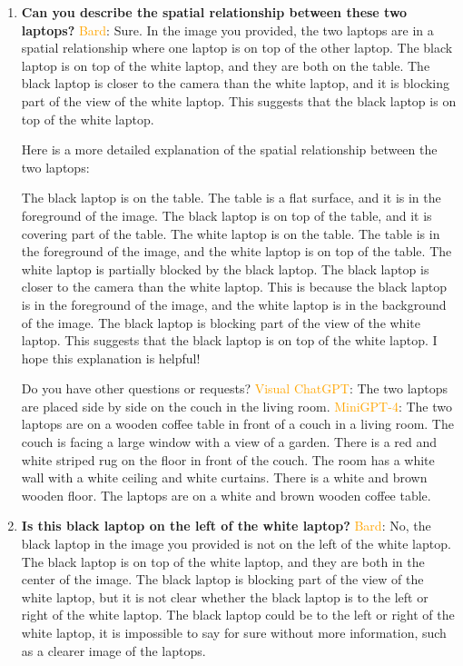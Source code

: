 \begin{enumerate}
    \item \textbf{Can you describe the spatial relationship between these two laptops?}
    \subitem \textcolor{orange}{Bard}: Sure. In the image you provided, the two laptops are in a spatial relationship where one laptop is on top of the other laptop. The black laptop is on top of the white laptop, and they are both on the table. The black laptop is closer to the camera than the white laptop, and it is blocking part of the view of the white laptop. This suggests that the black laptop is on top of the white laptop.

    Here is a more detailed explanation of the spatial relationship between the two laptops:
    
    The black laptop is on the table. The table is a flat surface, and it is in the foreground of the image. The black laptop is on top of the table, and it is covering part of the table.
    The white laptop is on the table. The table is in the foreground of the image, and the white laptop is on top of the table. The white laptop is partially blocked by the black laptop.
    The black laptop is closer to the camera than the white laptop. This is because the black laptop is in the foreground of the image, and the white laptop is in the background of the image.
    The black laptop is blocking part of the view of the white laptop. This suggests that the black laptop is on top of the white laptop.
    I hope this explanation is helpful!
    
    Do you have other questions or requests?
    \subitem \textcolor{orange}{Visual ChatGPT}: The two laptops are placed side by side on the couch in the living room.
    \subitem \textcolor{orange}{MiniGPT-4}: The two laptops are on a wooden coffee table in front of a couch in a living room. The couch is facing a large window with a view of a garden. There is a red and white striped rug on the floor in front of the couch. The room has a white wall with a white ceiling and white curtains. There is a white and brown wooden floor. The laptops are on a white and brown wooden coffee table.
    \item \textbf{Is this black laptop on the left of the white laptop?}
    \subitem \textcolor{orange}{Bard}: No, the black laptop in the image you provided is not on the left of the white laptop. The black laptop is on top of the white laptop, and they are both in the center of the image. The black laptop is blocking part of the view of the white laptop, but it is not clear whether the black laptop is to the left or right of the white laptop. The black laptop could be to the left or right of the white laptop, it is impossible to say for sure without more information, such as a clearer image of the laptops.


\end{enumerate}
